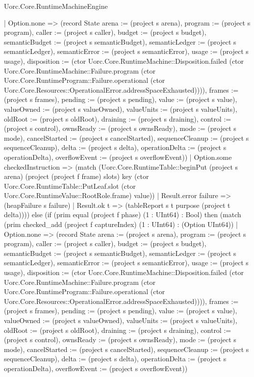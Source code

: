 \begin{lexlean}{Uorc.Core.RuntimeMachineEngine}
\begin{semanticmodule}
{        | Option.none => (record State {arena := (project s arena), program := (project s program), caller := (project s caller), budget := (project s budget), semanticBudget := (project s semanticBudget), semanticLedger := (project s semanticLedger), semanticError := (project s semanticError), usage := (project s usage), disposition := (ctor Uorc.Core.RuntimeMachine::Disposition.failed (ctor Uorc.Core.RuntimeMachine::Failure.program (ctor Uorc.Core.RuntimeProgram::Failure.operational (ctor Uorc.Core.Resources::OperationalError.addressSpaceExhausted)))), frames := (project s frames), pending := (project s pending), value := (project s value), valueOwned := (project s valueOwned), valueUnits := (project s valueUnits), oldRoot := (project s oldRoot), draining := (project s draining), control := (project s control), ownsReady := (project s ownsReady), mode := (project s mode), cancelStarted := (project s cancelStarted), sequenceCleanup := (project s sequenceCleanup), delta := (project s delta), operationDelta := (project s operationDelta), overflowEvent := (project s overflowEvent)})
        | Option.some checkedInstruction => (match (Uorc.Core.RuntimeTable::beginPut (project s arena) (project (project f frame) slots) key (ctor Uorc.Core.RuntimeTable::PutLeaf.slot (ctor Uorc.Core.RuntimeValue::RootRole.frame) value))
          | Result.error failure => (heapFailure s failure)
          | Result.ok t => (tableReport s t purpose (project t delta)))) else (if (prim equal (project f phase) (1 : UInt64) : Bool) then (match (prim checked_add (project f captureIndex) (1 : UInt64) : (Option UInt64))
        | Option.none => (record State {arena := (project s arena), program := (project s program), caller := (project s caller), budget := (project s budget), semanticBudget := (project s semanticBudget), semanticLedger := (project s semanticLedger), semanticError := (project s semanticError), usage := (project s usage), disposition := (ctor Uorc.Core.RuntimeMachine::Disposition.failed (ctor Uorc.Core.RuntimeMachine::Failure.program (ctor Uorc.Core.RuntimeProgram::Failure.operational (ctor Uorc.Core.Resources::OperationalError.addressSpaceExhausted)))), frames := (project s frames), pending := (project s pending), value := (project s value), valueOwned := (project s valueOwned), valueUnits := (project s valueUnits), oldRoot := (project s oldRoot), draining := (project s draining), control := (project s control), ownsReady := (project s ownsReady), mode := (project s mode), cancelStarted := (project s cancelStarted), sequenceCleanup := (project s sequenceCleanup), delta := (project s delta), operationDelta := (project s operationDelta), overflowEvent := (project s overflowEvent)})
}
\end{semanticmodule}
\end{lexlean}
